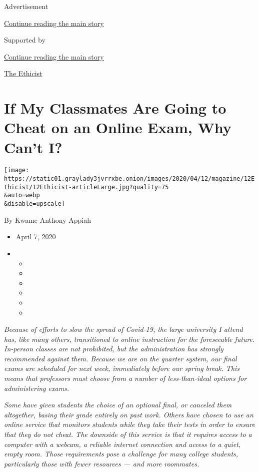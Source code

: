 Advertisement

\protect\hyperlink{after-top}{Continue reading the main story}

Supported by

\protect\hyperlink{after-sponsor}{Continue reading the main story}

\href{/column/the-ethicist}{The Ethicist}

\hypertarget{if-my-classmates-are-going-to-cheat-on-an-online-exam-why-cant-i}{%
\section{If My Classmates Are Going to Cheat on an Online Exam, Why
Can't
I?}\label{if-my-classmates-are-going-to-cheat-on-an-online-exam-why-cant-i}}

\texttt{[image: https://static01.graylady3jvrrxbe.onion/images/2020/04/12/magazine/12Ethicist/12Ethicist-articleLarge.jpg?quality=75\\\&auto=webp\\\&disable=upscale]}

By Kwame Anthony Appiah

\begin{itemize}
\item
  April 7, 2020
\item
  \begin{itemize}
  \item
  \item
  \item
  \item
  \item
  \item
  \end{itemize}
\end{itemize}

\emph{Because of efforts to slow the spread of Covid-19, the large
university I attend has, like many others, transitioned to online
instruction for the foreseeable future. In-person classes are not
prohibited, but the administration has strongly recommended against
them. Because we are on the quarter system, our final exams are
scheduled for next week, immediately before our spring break. This means
that professors must choose from a number of less-than-ideal options for
administering exams.}

\emph{Some have given students the choice of an optional final, or
canceled them altogether, basing their grade entirely on past work.
Others have chosen to use an online service that monitors students while
they take their tests in order to ensure that they do not cheat. The
downside of this service is that it requires access to a computer with a
webcam, a reliable internet connection and access to a quiet, empty
room. Those requirements pose a challenge for many college students,
particularly those with fewer resources --- and more roommates.}

